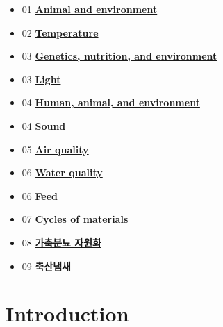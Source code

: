 \documentclass[]{book}
\providecommand{\tightlist}{%
  \setlength{\itemsep}{0pt}\setlength{\parskip}{0pt}}
\begin{document}
\begin{itemize}
\tightlist
\item
  01
  \textbf{\href{https://youngjunna.github.io/aes/02-AnimalandEnvironment}{Animal
  and environment}}\\
\item
  02
  \textbf{\href{https://youngjunna.github.io/aes/03-Temperature}{Temperature}}\\
\item
  03
  \textbf{\href{https://github.com/YoungjunNa/2019-animal-nutrition-and-the-environment/raw/master/03\%E1\%84\%8C\%E1\%85\%AE\%E1\%84\%8E\%E1\%85\%A1-\%E1\%84\%83\%E1\%85\%A9\%E1\%86\%BC\%E1\%84\%86\%E1\%85\%AE\%E1\%86\%AF\%E1\%84\%92\%E1\%85\%AA\%E1\%86\%AB\%E1\%84\%80\%E1\%85\%A7\%E1\%86\%BC\%E1\%84\%92\%E1\%85\%A1\%E1\%86\%A8.pdf}{Genetics,
  nutrition, and environment}}\\
\item
  03 \textbf{\href{https://youngjunna.github.io/aes/04-Light}{Light}}\\
\item
  04
  \textbf{\href{https://github.com/YoungjunNa/aes/raw/master/04-aes.pdf}{Human,
  animal, and environment}}\\
\item
  04 \textbf{\href{https://youngjunna.github.io/aes/05-Sound}{Sound}}\\
\item
  05 \textbf{\href{https://youngjunna.github.io/aes/06-AirQuality}{Air
  quality}}\\
\item
  06
  \textbf{\href{https://youngjunna.github.io/aes/07-WaterQuality}{Water
  quality}}\\
\item
  06
  \textbf{\href{https://youngjunna.github.io/aes/08-ByProducts}{Feed}}\\
\item
  07
  \textbf{\href{https://youngjunna.github.io/aes/09-CyclesOfMaterials}{Cycles
  of materials}}\\
\item
  08
  \textbf{\href{https://drive.google.com/file/d/1zayyDJWH9KQ0vKPsu2tNeH75u-USbIFv/view?usp=sharing}{가축분뇨
  자원화}}\\
\item
  09
  \textbf{\href{https://drive.google.com/open?id=1Hze2tdsbKGxIF02kD9K_9p8RFX9vLFoE}{축산냄새}}
\end{itemize}

\chapter{Introduction}\label{intro}
\end{document}
